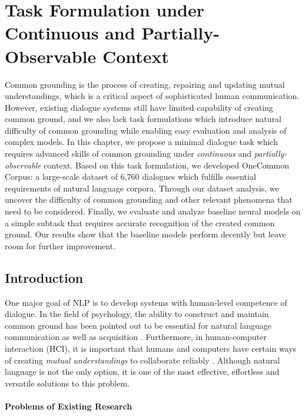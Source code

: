 \graphicspath{{03_task_formulation/figures/}} %

\chapter{Task Formulation under Continuous and Partially-Observable Context}
\label{03_chp:task_formulation}

Common grounding is the process of creating, repairing and updating mutual understandings, which is a critical aspect of sophisticated human communication. However, existing dialogue systems still have limited capability of creating common ground, and we also lack task formulations which introduce natural difficulty of common grounding while enabling easy evaluation and analysis of complex models. In this chapter, we propose a minimal dialogue task which requires advanced skills of common grounding under \textit{continuous} and \textit{partially-observable} context. Based on this task formulation, we developed OneCommon Corpus: a large-scale dataset of 6,760 dialogues which fulfills essential requirements of natural language corpora. Through our dataset analysis, we uncover the difficulty of common grounding and other relevant phenomena that need to be considered. Finally, we evaluate and analyze baseline neural models on a simple subtask that requires accurate recognition of the created common ground. Our results show that the baseline models perform decently but leave room for further improvement.

\section{Introduction}
\label{03_sec:introduction}

One major goal of NLP is to develop systems with human-level competence of dialogue. In the field of psychology, the ability to construct and maintain common ground has been pointed out to be essential for natural language communication \citep{clark1996using} as well as acquisition \citep{tomasello2009constructing}. Furthermore, in human-computer interaction (HCI), it is important that humans and computers have certain ways of creating \emph{mutual understandings} to collaborate reliably \citep{brennan1998grounding}. Although natural language is not the only option, it is one of the most effective, effortless and versatile solutions to this problem.

\subsubsection{Problems of Existing Research}

